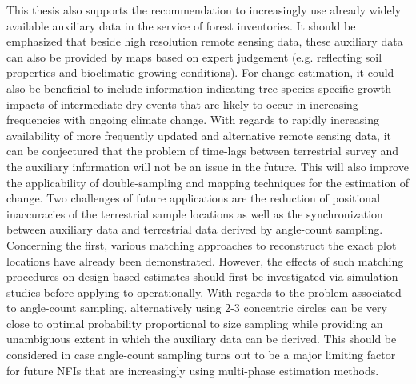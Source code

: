 This thesis also supports the recommendation to increasingly use already widely available auxiliary data in the service of forest inventories. It should be emphasized that beside high resolution remote sensing data, these auxiliary data can also be provided by maps based on expert judgement (e.g. reflecting soil properties and bioclimatic growing conditions). For change estimation, it could also be beneficial to include information indicating tree species specific growth impacts of intermediate dry events that are likely to occur in increasing frequencies with ongoing climate change. With regards to rapidly increasing availability of more frequently updated and alternative remote sensing data, it can be conjectured that the problem of time-lags between terrestrial survey and the auxiliary information will not be an issue in the future. This will also improve the applicability of double-sampling and mapping techniques for the estimation of change. Two challenges of future applications are the reduction of positional inaccuracies of the terrestrial sample locations as well as the synchronization between auxiliary data and terrestrial data derived by angle-count sampling. Concerning the first, various matching approaches to reconstruct the exact plot locations have already been demonstrated. However, the effects of such matching procedures on design-based estimates should first be investigated via simulation studies before applying to operationally. With regards to the problem associated to angle-count sampling, alternatively using 2-3 concentric circles can be very close to optimal probability proportional to size sampling \citep{mandallaz2008} while providing an unambiguous extent in which the auxiliary data can be derived. This should be considered in case angle-count sampling turns out to be a major limiting factor for future NFIs that are increasingly using multi-phase estimation methods.\par
 




